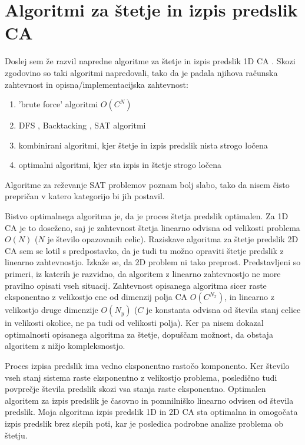 \documentclass[12pt,a4paper,openany,twoside]{book}
\begin{document}
\section{Algoritmi za štetje in izpis predslik CA}

Doslej sem že razvil napredne algoritme za štetje in izpis predslik 1D CA \cite{JerasDobnikar2007}.
Skozi zgodovino so taki algoritmi napredovali, tako da je padala njihova
računska zahtevnost in opisna/implementacijska zahtevnost:
\begin{enumerate}
 \item 'brute force' algoritmi \cite{WikiBruteForce} \( O(C^N) \)
 \item DFS \cite{WikiDFS}, Backtacking \cite{WikiBacktracking}, SAT \cite{WikiSAT} algoritmi
 \item kombinirani algoritmi, kjer štetje in izpis predslik nista strogo ločena
 \item optimalni algoritmi, kjer sta izpis in štetje strogo ločena
\end{enumerate}
Algoritme za reževanje SAT problemov poznam bolj slabo,
tako da nisem čisto prepričan v katero kategorijo bi jih postavil.

Bistvo optimalnega algoritma je, da je proces štetja predslik optimalen.
Za 1D CA je to doseženo, saj je zahtevnost štetja
linearno odvisna od velikosti problema \(O(N)\) (\(N\) je število opazovanih celic). 
Raziskave algoritma za štetje predslik 2D CA sem se lotil s predpostavko,
da je tudi tu možno opraviti štetje predslik z linearno zahtevnostjo.
Izkaže se, da 2D problem ni tako preprost.
Predstavljeni so primeri, iz katerih je razvidno,
da algoritem z linearno zahtevnostjo ne more pravilno opisati vseh situacij.
Zahtevnost opisanega algoritma sicer raste eksponentno z velikostjo ene
od dimenzij polja CA \( O(C^{N_x}) \), in linearno z velikostjo druge dimenzije \( O(N_y) \)
(\(C\) je konstanta odvisna od števila stanj celice in velikosti okolice, ne pa tudi od velikosti polja).
Ker pa nisem dokazal optimalnosti opisanega algoritma za štetje,
dopuščam možnost, da obstaja algoritem z nižjo kompleksnostjo.

Proces izpisa predslik ima vedno eksponentno rastočo komponento.
Ker število vseh stanj sistema raste eksponentno z velikostjo problema,
posledično tudi povprečje števila predslik skozi vsa stanja raste eksponentno.
Optimalen algoritem za izpis predslik je časovno in pomnilniško linearno odvisen od števila predslik.
Moja algoritma izpis predslik 1D in 2D CA sta optimalna in
omogočata izpis predslik brez slepih poti,
kar je posledica podrobne analize problema ob štetju.
\end{document}
